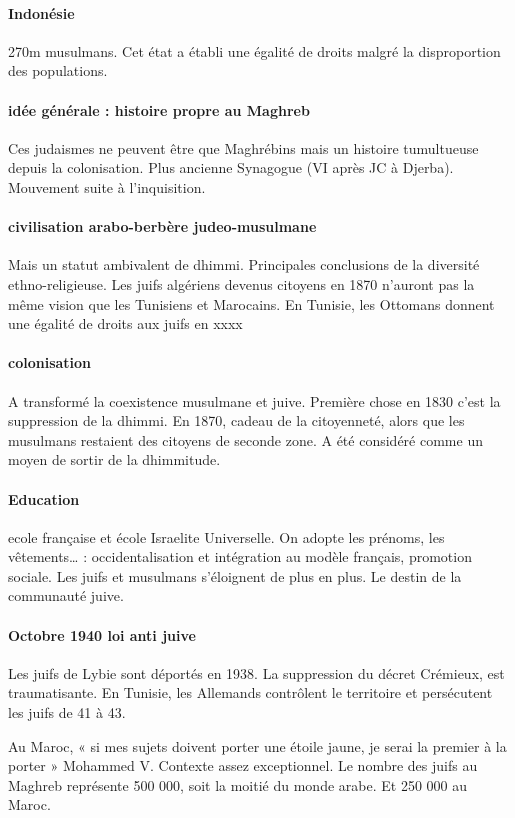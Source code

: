 \paragraph{Indonésie} 270m musulmans.  Cet état a établi une égalité de droits malgré la disproportion des populations. 

\paragraph{idée générale : histoire propre au Maghreb} Ces judaismes ne peuvent être que Maghrébins mais un histoire tumultueuse depuis la colonisation.  Plus ancienne Synagogue (VI après JC à Djerba). Mouvement suite à l’inquisition. 
\paragraph{civilisation arabo-berbère judeo-musulmane} Mais un statut ambivalent de dhimmi. Principales conclusions de la diversité ethno-religieuse.  Les juifs algériens devenus citoyens en 1870 n’auront pas la même vision que les Tunisiens et Marocains. En Tunisie, les Ottomans donnent une égalité de droits aux juifs en xxxx


\paragraph{colonisation} A transformé la coexistence musulmane et juive. Première chose en 1830 c’est la suppression de la dhimmi. En 1870, cadeau de la citoyenneté, alors que les musulmans restaient des citoyens de seconde zone.  A été considéré comme un moyen de sortir de la dhimmitude.

\paragraph{Education} ecole française et école Israelite Universelle. On adopte les prénoms, les vêtements… : occidentalisation et intégration au modèle français, promotion sociale.  Les juifs et musulmans s’éloignent de plus en plus.  Le destin de la communauté juive. 
\paragraph{Octobre 1940 loi anti juive} Les juifs de Lybie sont déportés en 1938. La suppression du décret Crémieux, est traumatisante. En Tunisie, les Allemands contrôlent le territoire et persécutent les juifs de 41 à 43.

Au Maroc, « si mes sujets doivent porter une étoile jaune, je serai la premier à la porter » Mohammed V. Contexte assez exceptionnel. Le nombre des juifs au Maghreb représente 500 000, soit la moitié du monde arabe. Et 250 000 au Maroc.
